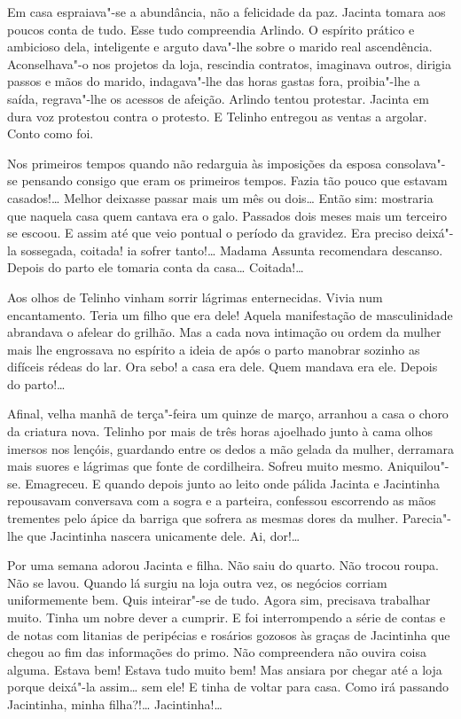 Em casa espraiava"-se a abundância, não a felicidade da paz. Jacinta
tomara aos poucos conta de tudo. Esse tudo compreendia Arlindo. O
espírito prático e ambicioso dela, inteligente e arguto dava"-lhe sobre o
marido real ascendência. Aconselhava"-o nos projetos da loja, rescindia
contratos, imaginava outros, dirigia passos e mãos do marido,
indagava"-lhe das horas gastas fora, proibia"-lhe a saída, regrava"-lhe os
acessos de afeição. Arlindo tentou protestar. Jacinta em dura voz
protestou contra o protesto. E Telinho entregou as ventas a argolar.
Conto como foi.

Nos primeiros tempos quando não redarguia às imposições da esposa
consolava"-se pensando consigo que eram os primeiros tempos. Fazia tão
pouco que estavam casados!\ldots{} Melhor deixasse passar mais um mês ou
dois\ldots{} Então sim: mostraria que naquela casa quem cantava era o galo.
Passados dois meses mais um terceiro se escoou. E assim até que veio
pontual o período da gravidez. Era preciso deixá"-la sossegada, coitada!
ia sofrer tanto!\ldots{} Madama Assunta recomendara descanso. Depois do parto
ele tomaria conta da casa\ldots{} Coitada!\ldots{}

Aos olhos de Telinho vinham sorrir lágrimas enternecidas. Vivia num
encantamento. Teria um filho que era dele! Aquela manifestação de
masculinidade abrandava o afelear do grilhão. Mas a cada nova intimação
ou ordem da mulher mais lhe engrossava no espírito a ideia de após o
parto manobrar sozinho as difíceis rédeas do lar. Ora sebo! a casa era
dele. Quem mandava era ele. Depois do parto!\ldots{}

Afinal, velha manhã de terça"-feira um quinze de março, arranhou a casa o
choro da criatura nova. Telinho por mais de três horas ajoelhado junto à
cama olhos imersos nos lençóis, guardando entre os dedos a mão gelada da
mulher, derramara mais suores e lágrimas que fonte de cordilheira.
Sofreu muito mesmo. Aniquilou"-se. Emagreceu. E quando depois junto ao
leito onde pálida Jacinta e Jacintinha repousavam conversava com a sogra
e a parteira, confessou escorrendo as mãos trementes pelo ápice da
barriga que sofrera as mesmas dores da mulher. Parecia"-lhe que
Jacintinha nascera unicamente dele. Ai, dor!\ldots{}

Por uma semana adorou Jacinta e filha. Não saiu do quarto. Não trocou
roupa. Não se lavou. Quando lá surgiu na loja outra vez, os negócios
corriam uniformemente bem. Quis inteirar"-se de tudo. Agora sim,
precisava trabalhar muito. Tinha um nobre dever a cumprir. E foi
interrompendo a série de contas e de notas com litanias de peripécias e
rosários gozosos às graças de Jacintinha que chegou ao fim das
informações do primo. Não compreendera não ouvira coisa alguma. Estava
bem! Estava tudo muito bem! Mas ansiara por chegar até a loja porque
deixá"-la assim\ldots{} sem ele! E tinha de voltar para casa. Como irá
passando Jacintinha, minha filha?!\ldots{} Jacintinha!\ldots{}

